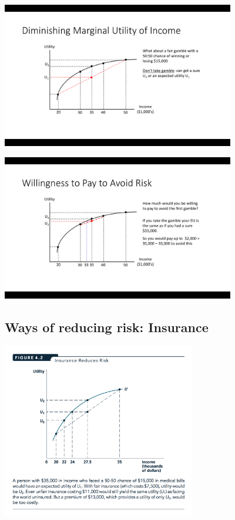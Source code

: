 \documentclass[]{article}
\begin{document}
\includegraphics[height=2.5in]{picsfigs/riskaversion4.png}

\includegraphics[height=2.5in]{picsfigs/riskaversion5a.png}

\hypertarget{ways-of-reducing-risk-insurance}{%
\subsection{Ways of reducing risk:
Insurance}\label{ways-of-reducing-risk-insurance}}

\includegraphics[height=3in]{picsfigs/insurancereducesrisk.png}
\end{document}
